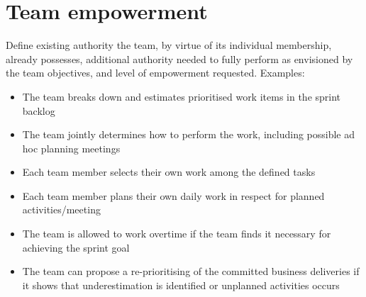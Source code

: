 \section{Team empowerment}
Define existing authority the team, by virtue of its individual membership, already possesses, additional
authority needed to fully perform as envisioned by the team objectives, and level of empowerment requested.
Examples:
\begin{itemize}
    \item The team breaks down and estimates prioritised work items in the sprint backlog
    \item The team jointly determines how to perform the work, including possible ad hoc planning meetings
    \item Each team member selects their own work among the defined tasks
    \item Each team member plans their own daily work in respect for planned activities/meeting
    \item The team is allowed to work overtime if the team finds it necessary for achieving the sprint goal
    \item The team can propose a re-prioritising of the committed business deliveries if it shows that underestimation is identified or unplanned activities occurs
\end{itemize}
